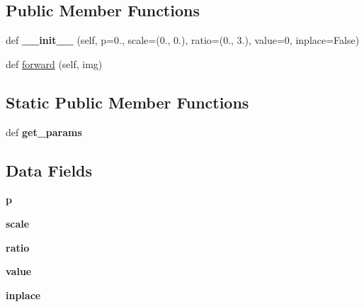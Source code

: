 \subsection*{Public Member Functions}
\begin{DoxyCompactItemize}
\item 
\mbox{\label{classtorchvision_1_1transforms_1_1transforms_1_1RandomErasing_a314a25b5f6af8035b206a72d22bcc58b}} 
def {\bfseries \+\_\+\+\_\+init\+\_\+\+\_\+} (self, p=0., scale=(0., 0.), ratio=(0., 3.), value=0, inplace=False)
\item 
def \hyperlink{classtorchvision_1_1transforms_1_1transforms_1_1RandomErasing_a52c63a0be4bb63dfbda8b2807a2cbc65}{forward} (self, img)
\end{DoxyCompactItemize}
\subsection*{Static Public Member Functions}
\begin{DoxyCompactItemize}
\item 
\mbox{\label{classtorchvision_1_1transforms_1_1transforms_1_1RandomErasing_a35f4accc4b308d2b76198f70c4602aa6}} 
def {\bfseries get\+\_\+params}
\end{DoxyCompactItemize}
\subsection*{Data Fields}
\begin{DoxyCompactItemize}
\item 
\mbox{\label{classtorchvision_1_1transforms_1_1transforms_1_1RandomErasing_a35ba5ac1454005e1342878a7948cb461}} 
{\bfseries p}
\item 
\mbox{\label{classtorchvision_1_1transforms_1_1transforms_1_1RandomErasing_ae98a3fc51136d1614ac2585c0ad2d88f}} 
{\bfseries scale}
\item 
\mbox{\label{classtorchvision_1_1transforms_1_1transforms_1_1RandomErasing_a516c608cdaa9caf2cf8ed4714b9b7691}} 
{\bfseries ratio}
\item 
\mbox{\label{classtorchvision_1_1transforms_1_1transforms_1_1RandomErasing_af25d25ee1f87d92d8f0f93f380f9a194}} 
{\bfseries value}
\item 
\mbox{\label{classtorchvision_1_1transforms_1_1transforms_1_1RandomErasing_ace1e6bf62d53202f7d16180fdd2a3f7e}} 
{\bfseries inplace}
\end{DoxyCompactItemize}

